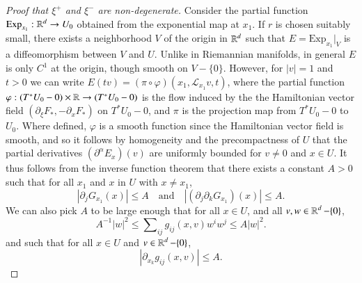 \begin{proof}[Proof that $\xi^+$ and $\xi^-$ are non-degenerate]
    Consider the partial function $\text{Exp}_{x_1}: \operatorname{\mathbb{R}}^d \to U_0$ obtained from the exponential map at $x_1$. If $r$ is chosen suitably small, there exists a neighborhood $V$ of the origin in $\operatorname{\mathbb{R}}^d$ such that $E = \text{Exp}_{x_1}|_V$ is a diffeomorphism between $V$ and $U$. Unlike in Riemannian manifolds, in general $E$ is only $C^1$ at the origin, though smooth on $V - \{ 0 \}$. However, for $|v| = 1$ and $t > 0$ we can write $E(tv) = (\pi \circ \varphi)( x_1, \mathcal{L}_{x_1} v, t)$, where the partial function $\varphi: (T^* U_0 - 0) \times \operatorname{\mathbb{R}} \to (T^* U_0 - 0)$ is the flow induced by the the Hamiltonian vector field $( \partial_\xi F_*, - \partial_x F_*)$ on $T^* U_0 - 0$, and $\pi$ is the projection map from $T^* U_0 - 0$ to $U_0$. Where defined, $\varphi$ is a smooth function since the Hamiltonian vector field is smooth, and so it follows by homogeneity and the precompactness of $U$ that the partial derivatives $(\partial^\alpha E_x)(v)$ are uniformly bounded for $v \neq 0$ and $x \in U$. It thus follows from the inverse function theorem that there exists a constant $A > 0$ such that for all $x_1$ and $x$ in $U$ with $x \neq x_1$,
    \begin{equation} \label{GBounds}
        |\partial_j G_{x_1}(x)| \leq A \quad\text{and}\quad |(\partial_j \partial_k G_{x_1})(x)| \leq A.
    \end{equation}
    We can also pick $A$ to be large enough that for all $x \in U$, and all $v,w \in \operatorname{\mathbb{R}}^d - \{ 0 \}$,
    \begin{equation}
        A^{-1} |w|^2 \leq \sum\nolimits_{ij} g_{ij}(x,v) w^i w^j \leq A |w|^2.
    \end{equation}
    and such that for all $x \in U$ and $v \in \operatorname{\mathbb{R}}^d - \{ 0 \}$,
    \begin{equation} \label{gijbounds}
        |\partial_{x_k} g_{ij}(x,v)| \leq A.
    \end{equation}


\end{proof}
